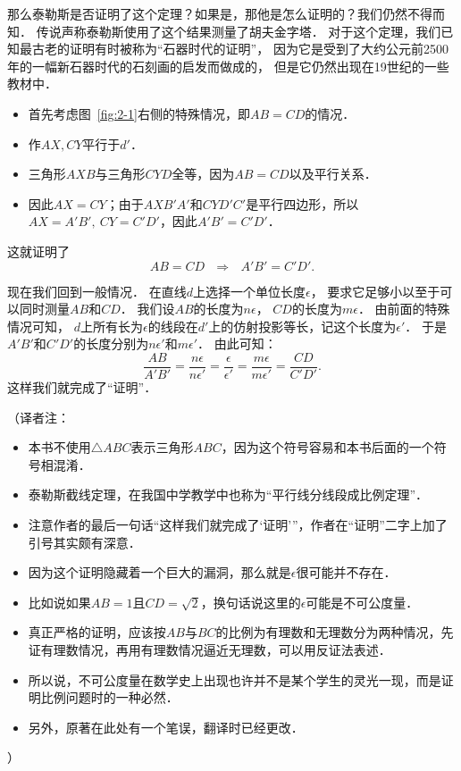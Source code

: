 \documentclass[cn,fancy,blue,11pt]{elegantbook}
\begin{document}
那么泰勒斯是否证明了这个定理？如果是，那他是怎么证明的？我们仍然不得而知．
传说声称泰勒斯使用了这个结果测量了胡夫金字塔．
对于这个定理，我们已知最古老的证明有时被称为``石器时代的证明''，
因为它是受到了大约公元前2500年的一幅新石器时代的石刻画的启发而做成的，
但是它仍然出现在19世纪的一些教材中．

\begin{itemize}
	\item 首先考虑图~\ref{fig:2-1}右侧的特殊情况，即$AB=CD$的情况．
	\item 作$AX,CY$平行于$d'$．
	\item 三角形$AXB$与三角形$CYD$全等，因为$AB=CD$以及平行关系．
	\item 因此$AX=CY$；由于$AXB'A'$和$CYD'C'$是平行四边形，所以$AX=A'B',~CY=C'D'$，因此$A'B'=C'D'$．
\end{itemize}
这就证明了\[AB=CD~~~\Longrightarrow~~~A'B'=C'D'.\]

现在我们回到一般情况．
在直线$d$上选择一个单位长度$\epsilon$，
要求它足够小以至于可以同时测量$AB$和$CD$．
我们设$AB$的长度为$n\epsilon$，
$CD$的长度为$m\epsilon$．
由前面的特殊情况可知，
$d$上所有长为$\epsilon$的线段在$d'$上的仿射投影等长，记这个长度为$\epsilon'$．
于是$A'B'$和$C'D'$的长度分别为$n\epsilon'$和$m\epsilon'$．
由此可知：
\[\frac{AB}{A'B'}=\frac{n\epsilon}{n\epsilon'}=\frac{\epsilon}{\epsilon'}
=\frac{m\epsilon}{m\epsilon'}=\frac{CD}{C'D'}.\]
这样我们就完成了``证明''．

\vskip 10pt
（译者注：
\begin{itemize}
	\item 本书不使用$\triangle ABC$表示三角形$ABC$，因为这个符号容易和本书后面的一个符号相混淆．
	\item 泰勒斯截线定理，在我国中学教学中也称为``平行线分线段成比例定理''．
	\item 注意作者的最后一句话``这样我们就完成了`证明'''，作者在``证明''二字上加了引号其实颇有深意．
	\item 因为这个证明隐藏着一个巨大的漏洞，那么就是$\epsilon$很可能并不存在．
	\item 比如说如果$AB=1$且$CD=\sqrt{2}$，换句话说这里的$\epsilon$可能是不可公度量．
	\item 真正严格的证明，应该按$AB$与$BC$的比例为有理数和无理数分为两种情况，先证有理数情况，再用有理数情况逼近无理数，可以用反证法表述．
	\item 所以说，不可公度量在数学史上出现也许并不是某个学生的灵光一现，而是证明比例问题时的一种必然．
	\item 另外，原著在此处有一个笔误，翻译时已经更改．
\end{itemize}
）
\end{document}
